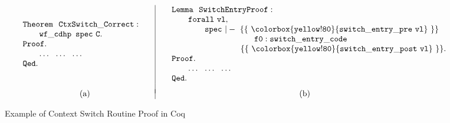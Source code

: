 \begin{figure}[!t]
    \centering
    \small
    \[
        \begin{array}{c|c}
        \begin{array}{l}
            {\tt Theorem \ \ CtxSwitch\_Correct: } \\
            \qquad 
            {\tt wf\_cdhp \ \, spec \ C}. \\
            {\tt Proof. }  \\
            \qquad \dots \ \ \dots \ \ \dots \\ 
            {\tt Qed. }
        \end{array} \quad & \quad
        \begin{array}{l}
            {\tt Lemma \ \ SwitchEntryProof: } \\
            \qquad 
            {\tt forall \ vl,} \\
            \qquad \qquad
            {\tt spec \ |- \ \{\{ \ \colorbox{yellow!80}{switch\_entry\_pre \ vl} \ \}\} } \\
            \qquad \qquad \qquad \qquad \qquad
            {\tt f0 : switch\_entry\_code} \\
            \qquad \qquad \qquad \qquad
            {\tt \ \{\{ \ \colorbox{yellow!80}{switch\_entry\_post \ vl} \ \}\}. } \\
            {\tt Proof.} \\
            \qquad \dots \ \ \dots \ \ \dots \\ 
            {\tt Qed. }
        \end{array} \\
        \\[-5pt]
        \text{(a)} & \text{(b)}
        \end{array}
    \]
    \caption{Example of Context Switch Routine Proof in Coq}
    \label{fig:CorrectCtx-Coq}
    \vspace{-0.5em}
\end{figure}
